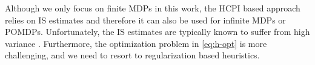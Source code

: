 Although we only focus on finite MDPs in this work, the HCPI based approach relies on IS estimates and therefore it can also be used for infinite MDPs or POMDPs. Unfortunately, the IS estimates are typically known to suffer from high variance \citep{guo2017using}. 
Furthermore, the optimization problem in \ref{eq:h-opt} is more challenging, and we need to resort to regularization based heuristics.
